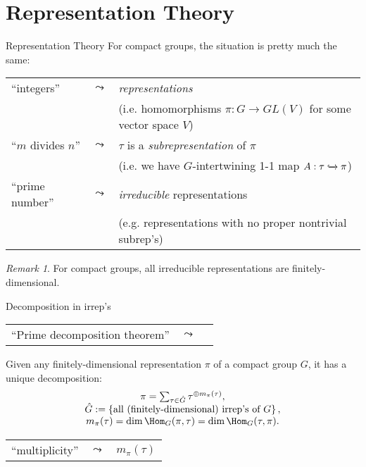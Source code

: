 \documentclass[pdf]{beamer}
\theoremstyle{mystyle}
\theoremstyle{remark}
\newtheorem{remark}{Remark}
\begin{document}
\section{Representation Theory}
\begin{frame}{Representation Theory}
	For compact groups, the situation is pretty much the same:
	\begin{center}
		\begin{tabular}[c]{llp{}}
			{``integers''}&$\leadsto$& {\it representations} \\&&(i.e. homomorphisms $\pi:G\to GL(V)$ for some vector space $V$)\\
			{``$m$ divides $n$''}&$\leadsto$&$\tau$ is a {\it subrepresentation} of $\pi$ \\&&(i.e. we have $G$-intertwining 1-1 map $A:\tau\xhookrightarrow{}\pi$)\\
			{``prime number''}&$\leadsto$&{\it irreducible} representations \\&&(e.g. representations with no proper nontrivial subrep's)
		\end{tabular}
	\end{center}
	\begin{remark}
		For compact groups, all irreducible representations are finitely-dimensional.
	\end{remark}
\end{frame}
\begin{frame}{Decomposition in irrep's}
	\begin{tabular}[c]{p{}lp{}}
			{``Prime decomposition theorem''}&$\leadsto$&
		\end{tabular}
		\begin{theorem}
			Given any finitely-dimensional representation $\pi$ of a compact group $G$, it has a unique decomposition:\begin{equation*}
				\begin{array}[]{c}
					\pi=\sum_{\tau\in\hat{G}}\tau^{\oplus m_{\pi}(\tau)},\\
					\hat{G}:=\left\{ \mbox{all (finitely-dimensional) irrep's of $G$} \right\},\\
					m_\pi(\tau)=\dim\Hom_{G}(\pi,\tau)=\dim\Hom_G(\tau,\pi).
				\end{array}
			\end{equation*}
		\end{theorem}
		\begin{tabular}[c]{p{}lp{}}
			{``multiplicity''}&$\leadsto$&$m_\pi(\tau)$
		\end{tabular}
\end{frame}
\end{document}
